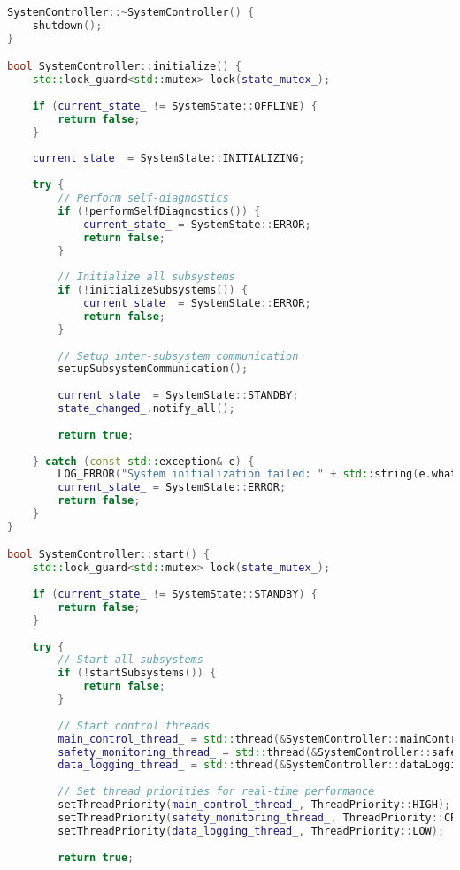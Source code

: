 \begin{lstlisting}[language=C++, caption={Main System Controller Implementation}, label={lst:app-main-controller}]
SystemController::~SystemController() {
    shutdown();
}

bool SystemController::initialize() {
    std::lock_guard<std::mutex> lock(state_mutex_);
    
    if (current_state_ != SystemState::OFFLINE) {
        return false;
    }
    
    current_state_ = SystemState::INITIALIZING;
    
    try {
        // Perform self-diagnostics
        if (!performSelfDiagnostics()) {
            current_state_ = SystemState::ERROR;
            return false;
        }
        
        // Initialize all subsystems
        if (!initializeSubsystems()) {
            current_state_ = SystemState::ERROR;
            return false;
        }
        
        // Setup inter-subsystem communication
        setupSubsystemCommunication();
        
        current_state_ = SystemState::STANDBY;
        state_changed_.notify_all();
        
        return true;
        
    } catch (const std::exception& e) {
        LOG_ERROR("System initialization failed: " + std::string(e.what()));
        current_state_ = SystemState::ERROR;
        return false;
    }
}

bool SystemController::start() {
    std::lock_guard<std::mutex> lock(state_mutex_);
    
    if (current_state_ != SystemState::STANDBY) {
        return false;
    }
    
    try {
        // Start all subsystems
        if (!startSubsystems()) {
            return false;
        }
        
        // Start control threads
        main_control_thread_ = std::thread(&SystemController::mainControlLoop, this);
        safety_monitoring_thread_ = std::thread(&SystemController::safetyMonitoringLoop, this);
        data_logging_thread_ = std::thread(&SystemController::dataLoggingLoop, this);
        
        // Set thread priorities for real-time performance
        setThreadPriority(main_control_thread_, ThreadPriority::HIGH);
        setThreadPriority(safety_monitoring_thread_, ThreadPriority::CRITICAL);
        setThreadPriority(data_logging_thread_, ThreadPriority::LOW);
        
        return true;
        

\end{lstlisting}
